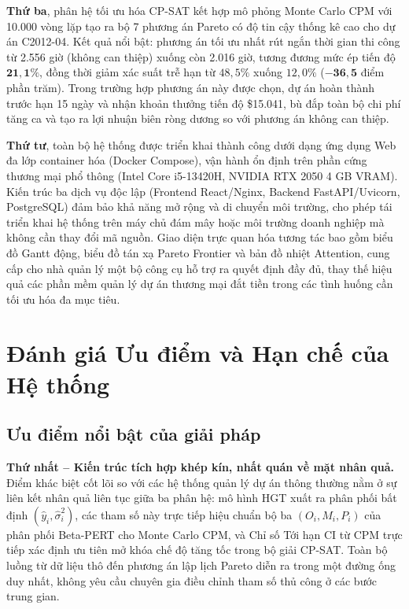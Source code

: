 \textbf{Thứ ba}, phân hệ tối ưu hóa CP-SAT kết hợp mô phỏng Monte Carlo CPM với 10.000 vòng lặp tạo ra bộ 7 phương án Pareto có độ tin cậy thống kê cao cho dự án C2012-04. Kết quả nổi bật: phương án tối ưu nhất rút ngắn thời gian thi công từ 2.556 giờ (không can thiệp) xuống còn 2.016 giờ, tương đương mức ép tiến độ $\mathbf{21{,}1\%}$, đồng thời giảm xác suất trễ hạn từ $48{,}5\%$ xuống $12{,}0\%$ ($\mathbf{-36{,}5}$ điểm phần trăm). Trong trường hợp phương án này được chọn, dự án hoàn thành trước hạn 15 ngày và nhận khoản thưởng tiến độ \$15.041, bù đắp toàn bộ chi phí tăng ca và tạo ra lợi nhuận biên ròng dương so với phương án không can thiệp.

\textbf{Thứ tư}, toàn bộ hệ thống được triển khai thành công dưới dạng ứng dụng Web đa lớp container hóa (Docker Compose), vận hành ổn định trên phần cứng thương mại phổ thông (Intel Core i5-13420H, NVIDIA RTX 2050 4 GB VRAM). Kiến trúc ba dịch vụ độc lập (Frontend React/Nginx, Backend FastAPI/Uvicorn, PostgreSQL) đảm bảo khả năng mở rộng và di chuyển môi trường, cho phép tái triển khai hệ thống trên máy chủ đám mây hoặc môi trường doanh nghiệp mà không cần thay đổi mã nguồn. Giao diện trực quan hóa tương tác bao gồm biểu đồ Gantt động, biểu đồ tán xạ Pareto Frontier và bản đồ nhiệt Attention, cung cấp cho nhà quản lý một bộ công cụ hỗ trợ ra quyết định đầy đủ, thay thế hiệu quả các phần mềm quản lý dự án thương mại đắt tiền trong các tình huống cần tối ưu hóa đa mục tiêu.


\section{Đánh giá Ưu điểm và Hạn chế của Hệ thống}
\label{sec:4.2_uu_nhuoc_diem}

\subsection{Ưu điểm nổi bật của giải pháp}
\label{sec:4.2.1_uu_diem}

\textbf{Thứ nhất -- Kiến trúc tích hợp khép kín, nhất quán về mặt nhân quả.}
Điểm khác biệt cốt lõi so với các hệ thống quản lý dự án thông thường nằm ở sự liên kết nhân quả liên tục giữa ba phân hệ: mô hình HGT xuất ra phân phối bất định $(\hat{y}_i, \hat{\sigma}_i^2)$, các tham số này trực tiếp hiệu chuẩn bộ ba $(O_i, M_i, P_i)$ của phân phối Beta-PERT cho Monte Carlo CPM, và Chỉ số Tới hạn CI từ CPM trực tiếp xác định ưu tiên mở khóa chế độ tăng tốc trong bộ giải CP-SAT. Toàn bộ luồng từ dữ liệu thô đến phương án lập lịch Pareto diễn ra trong một đường ống duy nhất, không yêu cầu chuyên gia điều chỉnh tham số thủ công ở các bước trung gian.

